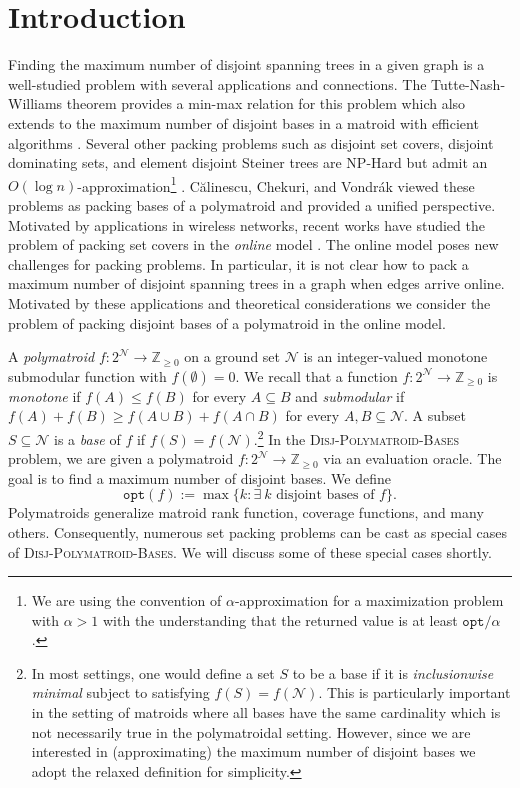 \documentclass[11pt]{article}
\theoremstyle{definition}
\newcommand{\DPB}{\textsc{Disj-Polymatroid-Bases}\xspace}
\newcommand{\opt}{\texttt{opt}}
\begin{document}
\section{Introduction}\label{section:intro}
Finding the maximum number of disjoint spanning trees in a given graph is a well-studied problem with several applications and connections. The Tutte-Nash-Williams theorem provides a min-max relation for this problem which also extends to the maximum number of disjoint bases in a matroid with efficient algorithms \cite{Schrijver-book}. Several other packing problems such as disjoint set covers, disjoint dominating sets, and element disjoint Steiner trees are NP-Hard but admit an $O(\log{n})$-approximation\footnote{We are using the convention of $\alpha$-approximation for a maximization problem with $\alpha > 1$ with the understanding that the returned value is at least $\opt/\alpha$.} \cite{FHKS02,CS07}. C{\u{a}}linescu, Chekuri, and Vondr\'{a}k \cite{CCV09} viewed these problems as packing bases of a polymatroid and provided a unified perspective. Motivated by applications in wireless networks, recent works have studied the problem of packing set covers in the \emph{online} model \cite{PBV15, EGK19, BBJ24}. 
The online model poses new challenges for packing problems. In particular, it is not clear how to pack a maximum number of disjoint spanning trees in a graph when edges arrive online.  Motivated by these applications and theoretical considerations we consider the problem of packing disjoint bases of a polymatroid in the online model. 

A \emph{polymatroid} $f:2^{\mathcal{N}}\rightarrow \mathbb{Z}_{\geq 0}$ on a ground set $\mathcal{N}$ is an integer-valued monotone submodular function with $f(\emptyset)=0$. We recall that a function $f: 2^{\mathcal{N}}\rightarrow \mathbb{Z}_{\geq 0}$ is \emph{monotone} if $f(A)\leq f(B)$ for every $A\subseteq B$ and \emph{submodular} if $f(A)+f(B)\geq f(A\cup B)+f(A\cap B)$ for every $A,B\subseteq \mathcal{N}$. A subset $S\subseteq \mathcal{N}$ is a \emph{base} of $f$ if $f(S)=f(\mathcal{N}).$\footnote{In most settings, one would define a set $S$ to be a base if it is \emph{inclusionwise minimal} subject to satisfying $f(S) = f(\mathcal{N})$. This is particularly important in the setting of matroids where all bases have the same cardinality which is not necessarily true in the polymatroidal setting. However, since we are interested in (approximating) the maximum number of disjoint bases we adopt the relaxed definition for simplicity.}
In the \DPB problem, we are given a polymatroid $f:2^{\mathcal{N}}\rightarrow \mathbb{Z}_{\geq 0}$ via an evaluation oracle. The goal is to find a maximum number of disjoint bases. We define 
\[
\opt(f):=\max\{k: \exists \ k \text{ disjoint bases of $f$}\}.
\]
Polymatroids generalize matroid rank function, coverage functions, and many others. Consequently, numerous set packing problems can be cast as special cases of \DPB. We will discuss some of these special cases shortly. 
\end{document}
